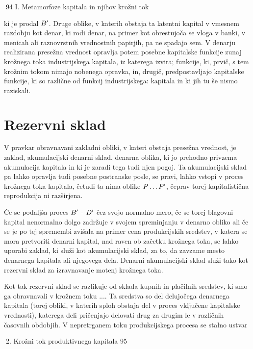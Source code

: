 \documentclass[kapital_02.tex]{subfiles}
\begin{document}
94 I. Metamorfoze kapitala in njihov krožni tok



 ki je prodal \( B' \). Druge oblike, v katerih obstaja ta latentni kapital v vmesnem razdobju kot denar, ki rodi denar, na primer kot obrestujoča se vloga v banki, v menicah ali raznovrstnih vrednostnih papirjih, pa ne spadajo sem. V denarju realizirana presežna vrednost opravlja potem posebne kapitalske funkcije zunaj krožnega toka industrijskega kapitala, iz katerega izvira; funkcije, ki, prvič, s tem krožnim tokom nimajo nobenega opravka, in, drugič, predpostavljajo kapitalske funkcije, ki so različne od funkcij industrijskega: kapitala in ki jih tu še nismo raziskali.

\section{Rezervni sklad}

V pravkar obravnavani zakladni obliki, v kateri obstaja presežna vrednost, je zaklad, akumulacijski denarni sklad, denarna oblika, ki jo prehodno privzema akumulacija kapitala in ki je zaradi tega tudi njen pogoj. Ta akumulacijski sklad pa lahko opravlja tudi posebne postranske posle, se pravi, lahko vstopi v proces krožnega toka kapitala, četudi ta nima oblike \( P \dots P' \), čeprav torej kapitalistična reprodukcija ni razširjena.

Če se podaljša proces \( B' \) - \( D' \) čez svojo normalno mero, če se torej blagovni kapital nenormalno dolgo zadržuje v svojem spreminjanju v denarno obliko ali če se je po tej spremembi zvišala na primer cena produkcijskih sredstev, v katera se mora pretvoriti denarni kapital, nad raven ob začetku krožnega toka, se lahko uporabi zaklad, ki služi kot akumulacijski sklad, za to, da zavzame mesto denarnega kapitala ali njegovega dela. Denarni akumulacijski sklad služi tako kot rezervni sklad za izravnavanje motenj krožnega toka.

Kot tak rezervni sklad se razlikuje od sklada kupnih in plačilnih sredstev, ki smo ga obravnavali v krožnem toku \KPEP...\KPEP. Ta sredstva so del delujočega denarnega kapitala (torej obliki, v katerih sploh obstaja del v proces vključene kapitalske vrednosti), katerega deli pričenjajo delovati drug za drugim le v različnih časovnih obdobjih. V nepretrganem toku produkcijskega procesa se stalno ustvar

 2. Krožni tok produktivnega kapitala 95
\end{document}
